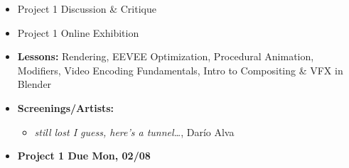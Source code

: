 \def\dMon{Mon, 02/08}
\def\dTues{Tues, 02/09}
\def\dWed{Wed, 02/10}
\def\dThur{Thur, 02/11}
\def\dFri{Fri, 02/12}
\def\dSat{Sat, 02/13}
\def\dSun{Sun, 02/14}
\placeDate

\begin{itemize}[noitemsep,topsep=0pt,leftmargin=*]
    \item Project 1 Discussion \& Critique
    \item Project 1 Online Exhibition
\end{itemize}
\vspace{1em}
\begin{itemize}[noitemsep,topsep=0pt,leftmargin=*]
    \item \textbf{Lessons:} Rendering, EEVEE Optimization, Procedural Animation, Modifiers, Video Encoding Fundamentals, Intro to Compositing \& VFX in Blender
    \item \textbf{Screenings/Artists:}
    \begin{itemize}
        \item \emph{still lost I guess, here’s a tunnel\dots}, Darío Alva
        \end{itemize}
    \item \textcolor{defaultColor}{\textbf{Project 1 Due \dMon}}
\end{itemize}